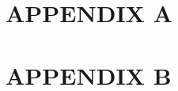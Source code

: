 \label{appendix}
	
\section*{APPENDIX A}
\label{secA1}

\newpage
\section*{APPENDIX B}
\label{secB1}